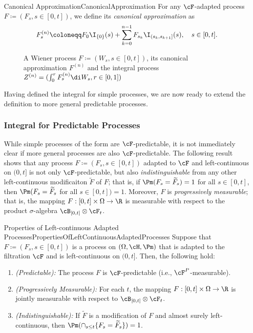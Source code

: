 \begin{defn}{Canonical Approximation}{CanonicalApproximation}
	For any $\cF$-adapted process $F \coloneqq (F_s, s \in [0, t])$, we define its \emph{canonical approximation} as
	\begin{equation}\label{eq:CanonicalApproximationDef}
		F_s^{(n)} \coloneqq F_0 \I_{\{0\}}(s) + \sum_{k=0}^{n-1} F_{s_k} \I_{(s_k, s_{k+1}]}(s), \quad s \in [0, t].
	\end{equation}
\end{defn}

\begin{figure}[H]
	\centering
	
	\caption{A Wiener process \(F \coloneqq (W_s, s \in [0, t])\), its canonical approximation \(F^{(n)}\) and the \Ito{} integral process \(Z^{(n)} = (\int_0^r F_s^{(n)} \di W_s, r \in [0, 1])\)}
	\label{fig:WienerProcessApproximation}
\end{figure}

Having defined the \Ito{} integral for simple processes, we are now ready to extend the definition to more general predictable processes.

\subsubsection{\Ito{} Integral for Predictable Processes}
While simple processes of the form  are \(\cF\)-predictable, it is not immediately clear if more general processes are also \(\cF\)-predictable. The following result shows that any process \(F \coloneqq (F_s, s \in [0, t])\) adapted to \(\cF\) and left-continuous on \((0,t]\) is not only \(\cF\)-predictable, but also \textit{indistinguishable} from any other left-continuous modificaiton \(\tilde{F}\) of \(F\); that is, if \(\Pm(F_s=\widetilde{F}_s)=1\) for all \(s \in [0,t]\), then \(\Pm(F_s = \widetilde{F}_s\) for all \(s \in [0,t]) = 1\). Moreover, \(F\) is \textit{progressively measurable}; that is, the mapping \(F : [0,t] \times \Omega \rightarrow \R\) is measurable with respect to the product \(\sigma\)-algebra \(\cB_{[0,t]} \otimes \cF_t\).

\begin{thm}{Properties of Left-continuous Adapted Processes}{PropertiesOfLeftContinuousAdaptedProcesses}
	Suppose that $F \coloneqq (F_s, s \in [0, t])$ is a process on $(\Omega, \cH, \Pm)$ that is adapted to the filtration $\cF$ and is left-continuous on $(0, t]$. Then, the following hold:
	\begin{enumerate}
		\item \emph{(Predictable):} The process $F$ is $\cF$-predictable (i.e., $\cF^P$-measurable).
		\item \emph{(Progressively Measurable):} For each $t$, the mapping $F : [0, t] \times \Omega \to \R$ is jointly measurable with respect to $\cB_{[0, t]} \otimes \cF_t$.
		\item \emph{(Indistinguishable):} If $\widetilde{F}$ is a modification of $F$ and almost surely left-continuous, then $\Pm(\cap_{s \le t} \{F_s = \widetilde{F}_s\}) = 1$.
	\end{enumerate}
\end{thm}

